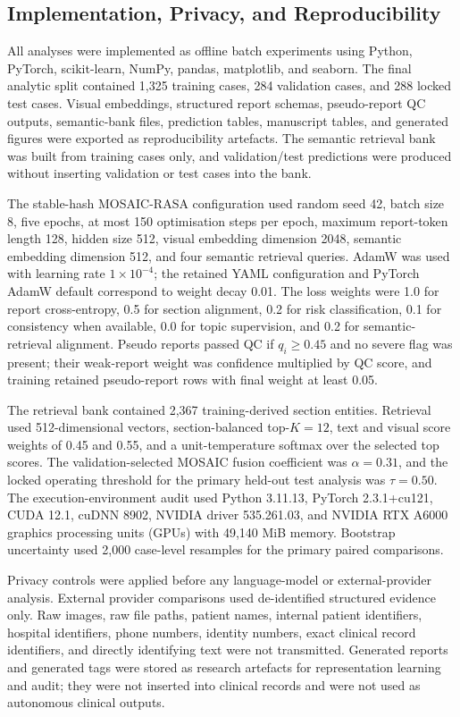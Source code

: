 \documentclass[11pt, a4paper]{article}
\theoremstyle{plain}
\theoremstyle{definition}
\begin{document}
\subsection{Implementation, Privacy, and Reproducibility}
\label{subsec:methods_implementation}

All analyses were implemented as offline batch experiments using Python, PyTorch, scikit-learn, NumPy, pandas, matplotlib, and seaborn. The final analytic split contained 1,325 training cases, 284 validation cases, and 288 locked test cases. Visual embeddings, structured report schemas, pseudo-report QC outputs, semantic-bank files, prediction tables, manuscript tables, and generated figures were exported as reproducibility artefacts. The semantic retrieval bank was built from training cases only, and validation/test predictions were produced without inserting validation or test cases into the bank.

The stable-hash MOSAIC-RASA configuration used random seed 42, batch size 8, five epochs, at most 150 optimisation steps per epoch, maximum report-token length 128, hidden size 512, visual embedding dimension 2048, semantic embedding dimension 512, and four semantic retrieval queries. AdamW was used with learning rate \(1\times10^{-4}\); the retained YAML configuration and PyTorch AdamW default correspond to weight decay 0.01. The loss weights were 1.0 for report cross-entropy, 0.5 for section alignment, 0.2 for risk classification, 0.1 for consistency when available, 0.0 for topic supervision, and 0.2 for semantic-retrieval alignment. Pseudo reports passed QC if \(q_i\geq0.45\) and no severe flag was present; their weak-report weight was confidence multiplied by QC score, and training retained pseudo-report rows with final weight at least 0.05.

The retrieval bank contained 2,367 training-derived section entities. Retrieval used 512-dimensional vectors, section-balanced top-\(K=12\), text and visual score weights of 0.45 and 0.55, and a unit-temperature softmax over the selected top scores. The validation-selected MOSAIC fusion coefficient was \(\alpha=0.31\), and the locked operating threshold for the primary held-out test analysis was \(\tau=0.50\). The execution-environment audit used Python 3.11.13, PyTorch 2.3.1+cu121, CUDA 12.1, cuDNN 8902, NVIDIA driver 535.261.03, and NVIDIA RTX A6000 graphics processing units (GPUs) with 49,140 MiB memory. Bootstrap uncertainty used 2,000 case-level resamples for the primary paired comparisons.

Privacy controls were applied before any language-model or external-provider analysis. External provider comparisons used de-identified structured evidence only. Raw images, raw file paths, patient names, internal patient identifiers, hospital identifiers, phone numbers, identity numbers, exact clinical record identifiers, and directly identifying text were not transmitted. Generated reports and generated tags were stored as research artefacts for representation learning and audit; they were not inserted into clinical records and were not used as autonomous clinical outputs.
\end{document}
